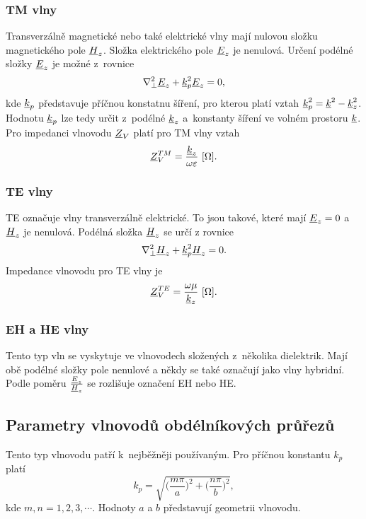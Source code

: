 \subsubsection*{TM vlny}
Transverzálně magnetické nebo také elektrické vlny mají nulovou složku magnetického pole ${\underline{H}}_{z}$. Složka elektrického pole ${\underline{E}}_{z}$ je nenulová. 
Určení podélné složky ${\underline{E}}_{z}$ je možné z~rovnice
\begin{displaymath}
	\nabla^{2}_{\perp} {\underline{E}}_{z} + {\underline{k}}_{p}^{2}{\underline{E}}_{z} = 0,
\end{displaymath}
kde ${\underline{k}}_{p}$ představuje příčnou konstatnu šíření, pro kterou platí vztah ${\underline{k}}_{p}^{2} = {\underline{k}}^{2} - {\underline{k}}_z^{2}$. Hodnotu ${\underline{k}}_{p}$ lze tedy určit z~podélné ${\underline{k}}_z$ a~konstanty šíření ve volném prostoru ${\underline{k}}$. Pro impedanci vlnovodu ${\underline{Z}}_{V}$ platí pro TM vlny vztah
\begin{displaymath}
   {\underline{Z}}_{V}^{TM} = \frac{{\underline{k}}_z}{\omega\varepsilon}\mathrm{\ [\Omega]}.
\end{displaymath}

\subsubsection*{TE vlny}
TE označuje vlny transverzálně elektrické. To jsou takové, které mají ${\underline{E}}_{z} = 0$ a ${\underline{H}}_{z}$ je nenulová. 
Podélná složka ${\underline{H}}_{z}$ se určí z rovnice 
\begin{displaymath}
	\nabla^{2}_{\perp} {\underline{H}}_{z} + {\underline{k}}_{p}^{2}{\underline{H}}_{z} = 0.
\end{displaymath}
Impedance vlnovodu pro TE vlny je
\begin{displaymath}
	{\underline{Z}}_{V}^{TE} = \frac{\omega\mu}{{\underline{k}}_z}\mathrm{\ [\Omega]}.
\end{displaymath} 
\subsubsection*{EH a HE vlny}
Tento typ vln se vyskytuje ve vlnovodech složených z~několika dielektrik. Mají obě podélné složky pole nenulové a někdy se také označují jako vlny hybridní. Podle poměru $\frac{{\underline{E}}_z}{{\underline{H}}_z}$ se rozlišuje označení EH nebo HE.

\subsection{Parametry vlnovodů obdélníkových průřezů}
Tento typ vlnovodu patří k~nejběžněji používaným. 
Pro příčnou konstantu $k_p$ platí 
\begin{displaymath}
	k_p = \sqrt{\bigg(\frac{m\pi}{a}\bigg)^{2} + \bigg(\frac{n\pi}{b}\bigg)^{2}},
\end{displaymath}
kde $m, n = 1, 2, 3,\cdots$. Hodnoty $a$ a $b$ představují geometrii vlnovodu.

